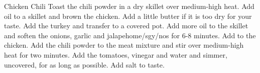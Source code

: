 \begin{recipe}{Chicken Chili}{}{}
Toast the chili powder in a dry skillet over medium-high heat.
Add oil to a skillet and brown the chicken. Add a little butter if it is too dry for your taste.  Add the turkey and transfer to a covered pot. 
Add more oil to the skillet and soften the onions, garlic and jalape\/home/sgy/{n}os for 6-8 minutes.  Add to the chicken.
\newstep
Add the chili powder to the meat mixture and stir over medium-high heat for two minutes.
Add the tomatoes, vinegar and water and simmer, uncovered, for as long as possible.  Add salt to taste.
\end{recipe}
